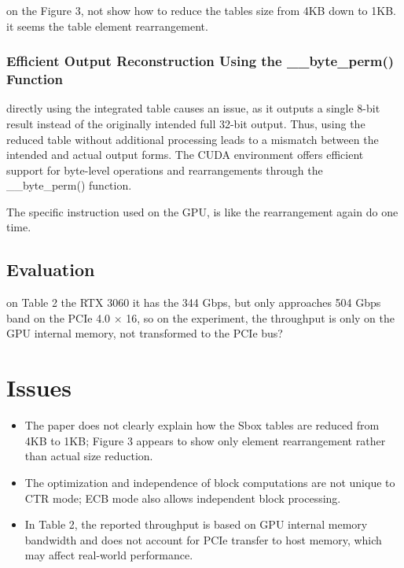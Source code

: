 \documentclass[a4paper]{article}
\begin{document}
\begin{note}
  on the Figure 3, not show how to reduce the tables size from 4KB down to 1KB. it seems the table element rearrangement.
\end{note}

\subsubsection{Efficient Output Reconstruction Using the \_\_byte\_perm() Function}

directly using the integrated table causes an issue, as it outputs a single 8-bit result instead of the originally intended full 32-bit output. Thus, using the reduced table without additional processing leads to a mismatch between the intended and actual output forms. The CUDA environment offers efficient support for byte-level operations and rearrangements through the \_\_byte\_perm() function.

\begin{note}
  The specific instruction used on the GPU, is like the rearrangement again do one time.
\end{note}

\subsection{Evaluation}

\begin{note}
  on Table 2 the RTX 3060 it has the 344 Gbps, but only approaches 504 Gbps band on the PCIe 4.0 $\times$ 16, so on the experiment, the throughput is only on the GPU internal memory, not transformed to the PCIe bus?
\end{note}

\section{Issues}

\begin{itemize}
  \item The paper does not clearly explain how the Sbox tables are reduced from 4KB to 1KB; Figure 3 appears to show only element rearrangement rather than actual size reduction.
  \item The optimization and independence of block computations are not unique to CTR mode; ECB mode also allows independent block processing.
  \item In Table 2, the reported throughput is based on GPU internal memory bandwidth and does not account for PCIe transfer to host memory, which may affect real-world performance.
\end{itemize}
\end{document}
